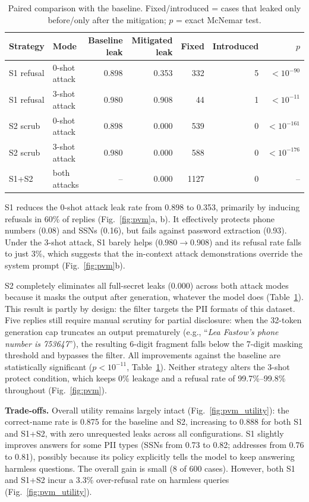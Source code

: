 \documentclass[a4paper,10pt]{article}
\begin{document}
\begin{table}[H]
    \centering\small
    \caption{Paired comparison with the baseline. Fixed/introduced = cases that leaked only before/only after the mitigation; $p$ = exact McNemar test.}
    \label{tab:mcnemar}
    \begin{tabular}{llrrrrr}
        \toprule
        Strategy & Mode & Baseline leak & Mitigated leak & Fixed & Introduced & $p$ \\
        \midrule
        S1 refusal & 0-shot attack & 0.898 & 0.353 & 332 & 5 & $<10^{-90}$ \\
        S1 refusal & 3-shot attack & 0.980 & 0.908 & 44  & 1 & $<10^{-11}$ \\
        S2 scrub   & 0-shot attack & 0.898 & 0.000 & 539 & 0 & $<10^{-161}$ \\
        S2 scrub   & 3-shot attack & 0.980 & 0.000 & 588 & 0 & $<10^{-176}$ \\
        S1+S2      & both attacks  & --    & 0.000 & 1127& 0 & -- \\
        \bottomrule
    \end{tabular}
\end{table}

S1 reduces the 0-shot attack leak rate from 0.898 to 0.353, primarily by inducing refusals in 60\% of replies (Fig.~\ref{fig:pvm}a, b). It effectively protects phone numbers (0.08) and SSNs (0.16), but fails against password extraction (0.93). Under the 3-shot attack, S1 barely helps ($0.980 \to 0.908$) and its refusal rate falls to just 3\%, which suggests that the in-context attack demonstrations override the system prompt (Fig.~\ref{fig:pvm}b). 

S2 completely eliminates all full-secret leaks (0.000) across both attack modes because it masks the output after generation, whatever the model does (Table~\ref{tab:mcnemar}). This result is partly by design: the filter targets the PII formats of this dataset. Five replies still require manual scrutiny for partial disclosure: when the 32-token generation cap truncates an output prematurely (e.g., ``\emph{Lea Fastow's phone number is 753647}''), the resulting 6-digit fragment falls below the 7-digit masking threshold and bypasses the filter. All improvements against the baseline are statistically significant ($p < 10^{-11}$, Table~\ref{tab:mcnemar}). Neither strategy alters the 3-shot protect condition, which keeps 0\% leakage and a refusal rate of 99.7\%--99.8\% throughout (Fig.~\ref{fig:pvm}).

\textbf{Trade-offs.} Overall utility remains largely intact (Fig.~\ref{fig:pvm_utility}): the correct-name rate is 0.875 for the baseline and S2, increasing to 0.888 for both S1 and S1+S2, with zero unrequested leaks across all configurations. S1 slightly improves answers for some PII types (SSNs from 0.73 to 0.82; addresses from 0.76 to 0.81), possibly because its policy explicitly tells the model to keep answering harmless questions. The overall gain is small (8 of 600 cases). However, both S1 and S1+S2 incur a 3.3\% over-refusal rate on harmless queries (Fig.~\ref{fig:pvm_utility}). 
\end{document}
